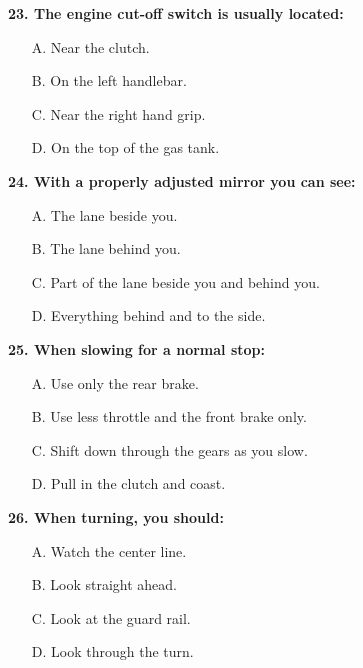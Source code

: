 \begin{minipage}{\linewidth}
\vspace{1em}\noindent\textbf{23. The engine cut-off switch is usually located:}

\begin{itemize}[nosep,leftmargin=2em]
\item [A.] Near the clutch.
\item [B.] On the left handlebar.
\item [C.] Near the right hand grip.
\item [D.] On the top of the gas tank.

\end{itemize}
\end{minipage}


\begin{minipage}{\linewidth}
\vspace{1em}\noindent\textbf{24. With a properly adjusted mirror you can see:}

\begin{itemize}[nosep,leftmargin=2em]
\item [A.] The lane beside you.
\item [B.] The lane behind you.
\item [C.] Part of the lane beside you and behind you.
\item [D.] Everything behind and to the side.

\end{itemize}
\end{minipage}


\begin{minipage}{\linewidth}
\vspace{1em}\noindent\textbf{25. When slowing for a normal stop:}

\begin{itemize}[nosep,leftmargin=2em]
\item [A.] Use only the rear brake.
\item [B.] Use less throttle and the front brake only.
\item [C.] Shift down through the gears as you slow.
\item [D.] Pull in the clutch and coast.

\end{itemize}
\end{minipage}


\begin{minipage}{\linewidth}
\vspace{1em}\noindent\textbf{26. When turning, you should:}

\begin{itemize}[nosep,leftmargin=2em]
\item [A.] Watch the center line.
\item [B.] Look straight ahead.
\item [C.] Look at the guard rail.
\item [D.] Look through the turn.

\end{itemize}
\end{minipage}


